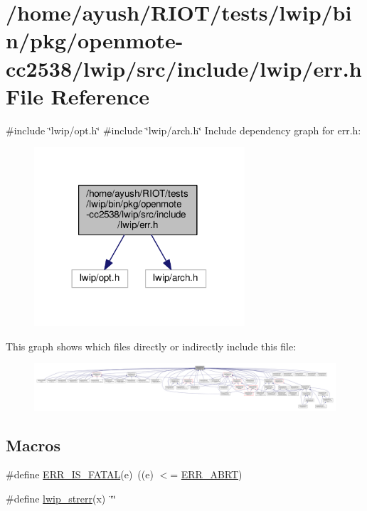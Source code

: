 \hypertarget{openmote-cc2538_2lwip_2src_2include_2lwip_2err_8h}{}\section{/home/ayush/\+R\+I\+O\+T/tests/lwip/bin/pkg/openmote-\/cc2538/lwip/src/include/lwip/err.h File Reference}
\label{openmote-cc2538_2lwip_2src_2include_2lwip_2err_8h}
{\ttfamily \#include \char`\"{}lwip/opt.\+h\char`\"{}}\newline
{\ttfamily \#include \char`\"{}lwip/arch.\+h\char`\"{}}\newline
Include dependency graph for err.\+h\+:
\nopagebreak
\begin{figure}[H]
\begin{center}
\leavevmode
\includegraphics[width=222pt]{openmote-cc2538_2lwip_2src_2include_2lwip_2err_8h__incl}
\end{center}
\end{figure}
This graph shows which files directly or indirectly include this file\+:
\nopagebreak
\begin{figure}[H]
\begin{center}
\leavevmode
\includegraphics[width=350pt]{openmote-cc2538_2lwip_2src_2include_2lwip_2err_8h__dep__incl}
\end{center}
\end{figure}
\subsection*{Macros}
\begin{DoxyCompactItemize}
\item 
\#define \hyperlink{group__infrastructure__errors_gac36f9cda08ffce1f67529a432a046248}{E\+R\+R\+\_\+\+I\+S\+\_\+\+F\+A\+T\+AL}(e)~((e) $<$= \hyperlink{group__infrastructure__errors_ggae2e66c7d13afc90ffecd6151680fbadcaf316b2c5eee4079820f7100849115142}{E\+R\+R\+\_\+\+A\+B\+RT})
\item 
\#define \hyperlink{openmote-cc2538_2lwip_2src_2include_2lwip_2err_8h_ab58c2561ad3b133e625183721b25ba27}{lwip\+\_\+strerr}(x)~\char`\"{}\char`\"{}
\end{DoxyCompactItemize}
